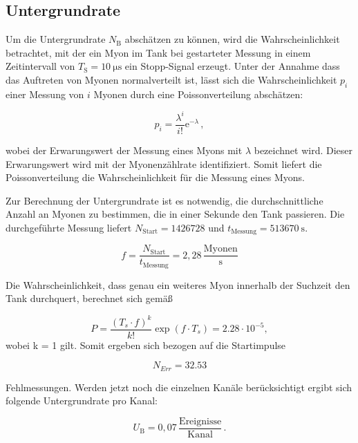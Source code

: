 \subsection{Untergrundrate}
\label{subsec:underground}

Um die Untergrundrate $N_\text{B}$ abschätzen zu können, wird die Wahrscheinlichkeit betrachtet, mit der ein Myon im Tank bei gestarteter Messung in einem Zeitintervall von $T_\text{S} = \SI{10}{\micro\second}$ ein Stopp-Signal erzeugt. Unter der Annahme dass das Auftreten von Myonen normalverteilt ist, lässt sich die Wahrscheinlichkeit $p_i$ einer Messung von $i$ Myonen durch eine Poissonverteilung abschätzen:

\begin{equation}
p_i = \frac{\lambda^i}{i!}\mathrm{e}^{-\lambda}\,,
\end{equation}

\noindent wobei der Erwarungswert der Messung eines Myons mit $\lambda$ bezeichnet wird. Dieser Erwarungswert wird mit der Myonenzählrate identifiziert. Somit liefert die Poissonverteilung die Wahrscheinlichkeit
für die Messung eines Myons.

\noindent Zur Berechnung der Untergrundrate ist es notwendig, die durchschnittliche Anzahl an Myonen zu bestimmen, die in einer Sekunde den Tank passieren.
Die durchgeführte Messung liefert $N_{\text{Start}} = 1426728$ und $t_{\text{Messung}} = \SI{513670}{\second}$.

\begin{equation}
f = \frac{N_{\text{Start}}}{t_{\text{Messung}}} = 2,28 \, \frac{\text{Myonen}}{\text{s}}
\end{equation}

\noindent Die Wahrscheinlichkeit, dass genau ein weiteres Myon innerhalb der Suchzeit den Tank durchquert, berechnet sich gemäß

\begin{equation}
P = \frac{(T_s \cdot f)^k}{k!} \exp{(f \cdot T_s)} = 2.28 \cdot 10^{-5},
\end{equation}
wobei k = 1 gilt. Somit ergeben sich bezogen auf die Startimpulse

\begin{equation}
N_{Err} = 32.53
\end{equation}

\noindent Fehlmessungen. Werden jetzt noch die einzelnen Kanäle berücksichtigt ergibt sich folgende Untergrundrate pro Kanal:

\begin{equation}
U_{\text{B}} = 0,07 \, \frac{\text{Ereignisse}}{\text{Kanal}}\,.
\end{equation}

